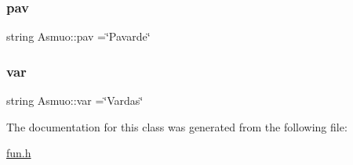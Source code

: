 \subsubsection{\texorpdfstring{pav}{pav}}
{\footnotesize\ttfamily string Asmuo\+::pav =\char`\"{}Pavarde\char`\"{}\hspace{0.3cm}{\ttfamily [protected]}}

\mbox{\label{class_asmuo_a8642c4f947a5b572f78b08669fd04fb0}} 
\subsubsection{\texorpdfstring{var}{var}}
{\footnotesize\ttfamily string Asmuo\+::var =\char`\"{}Vardas\char`\"{}\hspace{0.3cm}{\ttfamily [protected]}}



The documentation for this class was generated from the following file\+:\begin{DoxyCompactItemize}
\item 
\mbox{\hyperlink{fun_8h}{fun.\+h}}\end{DoxyCompactItemize}
